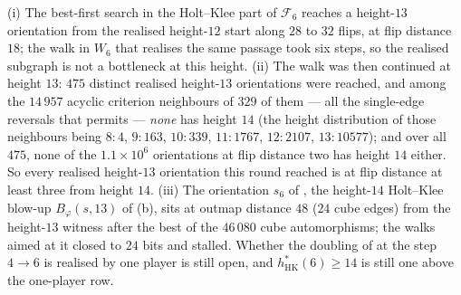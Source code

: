 \begin{remark}\label{mw:walk-state}
(i) The best-first search in the Holt--Klee part of $\mathcal F_6$ reaches a
height-$13$ orientation from the realised height-$12$ start along $28$ to $32$
flips, at flip distance $18$; the walk in $W_6$ that realises the same
passage took six steps, so the realised subgraph is not a bottleneck at this
height. (ii) The walk was then continued at height $13$: $475$ distinct
realised height-$13$ orientations were reached, and among the $14\,957$
acyclic criterion neighbours of $329$ of them --- all the single-edge
reversals that  permits --- \emph{none} has height $14$ (the
height distribution of those neighbours being $8{:}4$, $9{:}163$,
$10{:}339$, $11{:}1767$, $12{:}2107$, $13{:}10577$); and over all $475$, none
of the $1.1\times10^{6}$ orientations at flip distance two has height $14$
either. So every realised height-$13$ orientation this round reached is at
flip distance at least three from height $14$. (iii) The orientation $s_6$ of
, the height-$14$ Holt--Klee blow-up
$B_\varphi(s,13)$ of (b), sits at outmap
distance $48$ ($24$ cube edges) from the height-$13$ witness after the best of
the $46\,080$ cube automorphisms; the walks aimed at it closed to $24$ bits
and stalled. Whether the doubling of  at the step $4\to6$ is
realised by one player is still open, and $h^{\ast}_{\mathrm{HK}}(6)\ge14$ is
still one above the one-player row.
\end{remark}